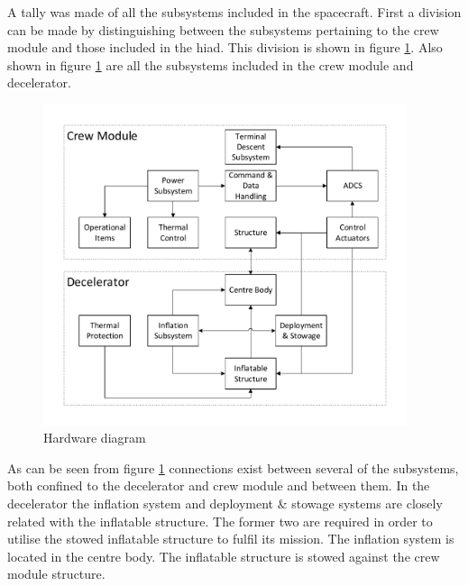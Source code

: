 A tally was made of all the subsystems included in the spacecraft. First a division can be made by distinguishing between the subsystems pertaining to the crew module and those included in the \gls{hiad}. This division is shown in figure \ref{fig:subsystems}. Also shown in figure \ref{fig:subsystems} are all the subsystems included in the crew module and decelerator.
\begin{figure}[ht]
	\includegraphics[width=0.95\textwidth]{./Figure/subsystem_breakdown/hardware_structure.pdf}
	\caption{Hardware diagram}
	\label{fig:subsystems} 
\end{figure}
%
%
%
%
%
%

As can be seen from figure \ref{fig:subsystems} connections exist between several of the subsystems, both confined to the decelerator and crew module and between them. In the decelerator the inflation system and deployment \& stowage systems are closely related with the inflatable structure. The former two are required in order to utilise the stowed inflatable structure to fulfil its mission. The inflation system is located in the centre body. The inflatable structure is stowed against the crew module structure.

